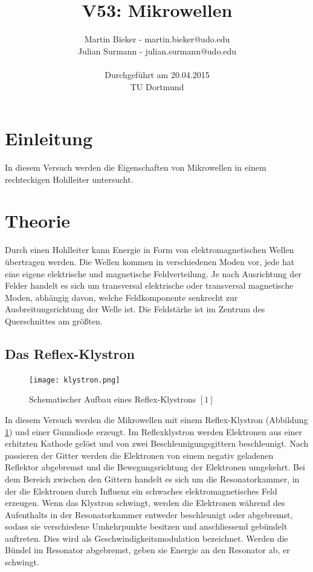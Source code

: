 \documentclass[a4paper]{article}
\title{\textbf{V53: Mikrowellen}}
\author{Martin Bieker - martin.bieker@udo.edu\\
Julian Surmann - julian.surmann@udo.edu\\
\\
Durchgef\"{u}hrt am 20.04.2015\\
TU Dortmund}
\date{}
\begin{document}
\renewcommand\tablename{Tabelle}
\renewcommand\figurename{Abbildung}
\maketitle
\thispagestyle{empty}
\newpage
\clearpage
\setcounter{page}{1}
\section{Einleitung}
In diesem Versuch werden die Eigenschaften von Mikrowellen in einem rechteckigen Hohlleiter untersucht.

\section{Theorie}
Durch einen Hohlleiter kann Energie in Form von elektromagnetischen Wellen übertragen werden. Die Wellen kommen in verschiedenen Moden vor, jede hat eine eigene elektrische und magnetische Feldverteilung. Je nach Ausrichtung der Felder handelt es sich um transversal elektrische oder transversal magnetische Moden, abhängig davon, welche Feldkomponente senkrecht zur Ausbreitungsrichtung der Welle ist. Die Feldstärke ist im Zentrum des Querschnittes am größten.

\subsection{Das Reflex-Klystron}
\begin{figure}[h]
\centering
\texttt{[image: klystron.png]}
\caption{Schematischer Aufbau eines Reflex-Klystrons $[1]$}
\label{klystron}
\end{figure}

\noindent
In diesem Versuch werden die Mikrowellen mit einem Reflex-Klystron (Abbildung \ref{klystron}) und einer Gunndiode erzeugt. Im Reflexklystron werden Elektronen aus einer erhitzten Kathode gelöst und von zwei Beschleunigungsgittern beschleunigt. Nach passieren der Gitter werden die Elektronen von einem negativ geladenen Reflektor abgebremst und die Bewegungsrichtung der Elektronen umgekehrt. Bei dem Bereich zwischen den Gittern handelt es sich um die Resonatorkammer, in der die Elektronen durch Influenz ein schwaches elektromagnetisches Feld erzeugen. Wenn das Klystron schwingt, werden die Elektronen während des Aufenthalts in der Resonatorkammer entweder beschleunigt oder abgebremst, sodass sie verschiedene Umkehrpunkte besitzen und anschliessend gebündelt auftreten. Dies wird als Geschwindigkeitsmodulation bezeichnet. Werden die Bündel im Resonator abgebremst, geben sie Energie an den Resonator ab, er schwingt.
\end{document}
